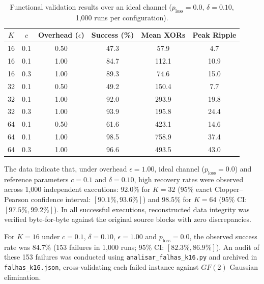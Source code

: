 \begin{table}[htbp]
    \centering
    \small
    \setlength{\tabcolsep}{6pt}
    \caption{Functional validation results over an ideal channel ($p_{\text{loss}} = 0.0$, $\delta = 0.10$, 1,000 runs per configuration).}
    \label{tab:validacao_funcional}
    \begin{tabular}{cccccc}
        \toprule
        \textbf{$K$} & \textbf{$c$} & \textbf{Overhead ($\epsilon$)} & \textbf{Success (\%)} & \textbf{Mean XORs} & \textbf{Peak Ripple} \\
        \midrule
        16 & 0.1 & 0.50 & 47.3 & 57.9 & 4.7 \\
        16 & 0.1 & 1.00 & 84.7 & 112.1 & 10.9 \\
        16 & 0.3 & 1.00 & 89.3 & 74.6 & 15.0 \\
        \midrule
        32 & 0.1 & 0.50 & 49.2 & 150.4 & 7.7 \\
        32 & 0.1 & 1.00 & 92.0 & 293.9 & 19.8 \\
        32 & 0.3 & 1.00 & 93.9 & 195.8 & 24.4 \\
        \midrule
        64 & 0.1 & 0.50 & 61.6 & 423.1 & 14.6 \\
        64 & 0.1 & 1.00 & 98.5 & 758.9 & 37.4 \\
        64 & 0.3 & 1.00 & 96.6 & 493.5 & 43.0 \\
        \bottomrule
    \end{tabular}
\end{table}

The data indicate that, under overhead $\epsilon = 1.00$, ideal channel ($p_{\text{loss}} = 0.0$) and reference parameters $c = 0.1$ and $\delta = 0.10$, high recovery rates were observed across 1,000 independent executions: 92.0\% for $K = 32$ (95\% exact Clopper--Pearson confidence interval: $[90.1\%, 93.6\%]$) and 98.5\% for $K = 64$ (95\% CI: $[97.5\%, 99.2\%]$). In all successful executions, reconstructed data integrity was verified byte-for-byte against the original source blocks with zero discrepancies.

For $K = 16$ under $c = 0.1$, $\delta = 0.10$, $\epsilon = 1.00$ and $p_{\text{loss}} = 0.0$, the observed success rate was 84.7\% (153 failures in 1,000 runs; 95\% CI: $[82.3\%, 86.9\%]$). An audit of these 153 failures was conducted using \texttt{analisar\_falhas\_k16.py} and archived in \texttt{falhas\_k16.json}, cross-validating each failed instance against $GF(2)$ Gaussian elimination.

